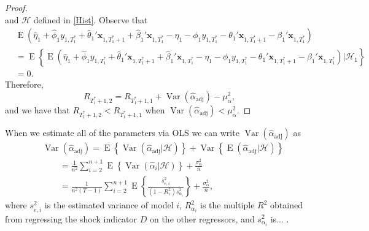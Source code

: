 \documentclass[11pt]{article}
\newcommand{\x}{\textbf{x}}
\newcommand{\Hist}{\mathcal{H}}
\DeclareMathOperator{\E}{E}
\DeclareMathOperator{\Var}{Var}
\begin{document}
\begin{proof}
$$$$
and $\Hist$ defined in \eqref{Hist}.  Observe that 
\begin{align*}
  &\E\left(\hat\eta_1 + \hat\phi_1 y_{1,T_1^*} + \hat\theta_1'\x_{1,T_1^*+1} 
    + \hat\beta_1'\x_{1,T_1^*} - \eta_1 - \phi_1 y_{1,T_1^*} 
    - \theta_1'\x_{1,T_1^*+1} - \beta_1'\x_{1,T_1^*}\right) \\
  &= \E\left\{\E\left(\hat\eta_1 + \hat\phi_1 y_{1,T_1^*} 
    + \hat\theta_1'\x_{1,T_1^*+1} + \hat\beta_1'\x_{1,T_1^*} - \eta_1 
    - \phi_1 y_{1,T_1^*} - \theta_1'\x_{1,T_1^*+1} 
    - \beta_1'\x_{1,T_1^*}\right)|\Hist_1\right\} \\
  &= 0.
\end{align*}
Therefore,
$$
  R_{T_1^*+1, 2} = R_{T_1^*+1, 1} + \Var(\hat{\alpha}_{\text{adj}}) - \mu_{\alpha}^2,
$$ 
and we have that $R_{T_1^*+1, 2} < R_{T_1^*+1, 1}$ when 
$\Var(\hat{\alpha}_{\text{adj}}) < \mu_{\alpha}^2$.
\end{proof}



When we estimate all of the parameters via OLS we can write 
$\Var(\hat{\alpha}_{\text{adj}})$ as
\begin{equation}
\begin{split}
  &\Var(\hat{\alpha}_{\text{adj}}) = \E\left\{\Var(\hat{\alpha}_{\text{adj}}|\Hist)\right\} 
    + \Var\left\{\E(\hat{\alpha}_{\text{adj}}|\Hist)\right\} \\
  &\qquad= \frac{1}{n^2} \sum_{i=2}^{n+1} \E\left\{\Var(\hat{\alpha}_i|\Hist)\right\} 
    + \frac{\sigma_{\alpha}^2}{n} \\
  &\qquad= \frac{1}{n^2(T-1)}\sum_{i=2}^{n+1} 
    \E\left\{\frac{s_{e,i}^2}{(1-R^2_i)s_{\alpha_i}^2}\right\} 
      + \frac{\sigma_{\alpha}^2}{n},
\label{reg}
\end{split}
\end{equation}
where $s_{e,i}^2$ is the estimated variance of model $i$, $R^2_{\alpha_i}$ is 
the multiple $R^2$ obtained from regressing the shock indicator $D$ on the 
other regressors, and $s_{\alpha_i}^2$ is... .
\end{document}
